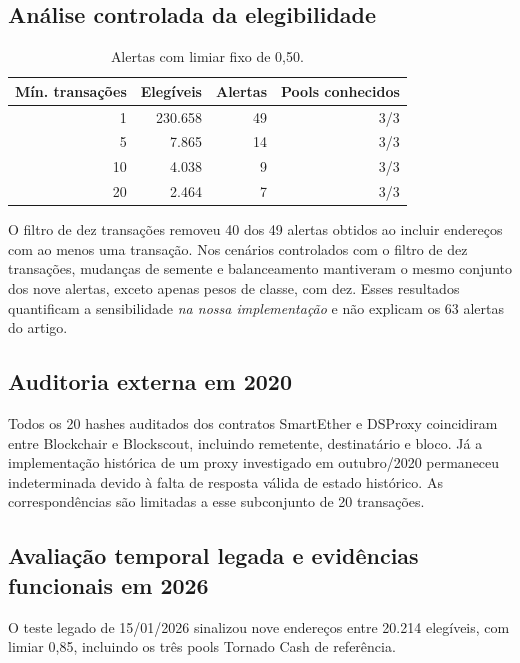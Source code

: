 \documentclass[11pt,a4paper]{article}
\begin{document}
\subsection{Análise controlada da elegibilidade}
\begin{table}[htbp]
\centering
\caption{Alertas com limiar fixo de 0,50.}
\label{tab:limiar}
\begin{tabular}{rrrr}
\toprule
Mín. transações & Elegíveis & Alertas & Pools conhecidos\\
\midrule
1 & 230.658 & 49 & 3/3\\
5 & 7.865 & 14 & 3/3\\
10 & 4.038 & 9 & 3/3\\
20 & 2.464 & 7 & 3/3\\
\bottomrule
\end{tabular}
\end{table}



O filtro de dez transações removeu 40 dos 49 alertas obtidos ao incluir endereços com ao menos uma transação. Nos cenários controlados com o filtro de dez transações, mudanças de semente e balanceamento mantiveram o mesmo conjunto dos nove alertas, exceto apenas pesos de classe, com dez. Esses resultados quantificam a sensibilidade \emph{na nossa implementação} e não explicam os 63 alertas do artigo.

\subsection{Auditoria externa em 2020}
Todos os 20 hashes auditados dos contratos SmartEther e DSProxy coincidiram entre Blockchair e Blockscout, incluindo remetente, destinatário e bloco. Já a implementação histórica de um proxy investigado em outubro/2020 permaneceu indeterminada devido à falta de resposta válida de estado histórico. As correspondências são limitadas a esse subconjunto de 20 transações.

\subsection{Avaliação temporal legada e evidências funcionais em 2026}
O teste legado de 15/01/2026 sinalizou nove endereços entre 20.214 elegíveis, com limiar 0,85, incluindo os três pools Tornado Cash de referência.
\end{document}
